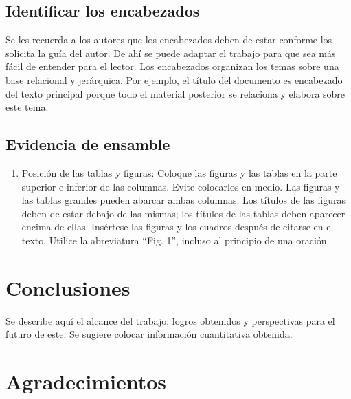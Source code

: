     \subsection{Identificar los encabezados}
    
    Se les recuerda a los autores que los encabezados deben de estar conforme los solicita la guía del autor. De ahí se puede adaptar el trabajo para que sea más fácil de entender para el lector.
    Los encabezados organizan los temas sobre una base relacional y jerárquica. Por ejemplo, el título del documento es encabezado del texto principal porque todo el material posterior se relaciona y elabora sobre este tema. 
    
    \subsection{Evidencia de ensamble}
    
    \newpage
    \label{anexo:evidencia1ManualDeEnsambleCircuitoElectrónicoESP32-C6.pdf}
    
    
    \begin{enumerate}
        \item Posición de las tablas y figuras: Coloque las figuras y las tablas en la parte superior e inferior de las columnas. Evite colocarlos en medio. Las figuras y las tablas grandes pueden abarcar ambas columnas. Los títulos de las figuras deben de estar debajo de las mismas; los títulos de las tablas deben aparecer encima de ellas. Insértese las figuras y los cuadros después de citarse en el texto. Utilice la abreviatura “Fig. 1”, incluso al principio de una oración. 
    \end{enumerate}
    
    \section{Conclusiones}
    
    Se describe aquí el alcance del trabajo, logros obtenidos y perspectivas para el futuro de este. Se sugiere colocar información cuantitativa obtenida.
    
    \section{Agradecimientos}
    
